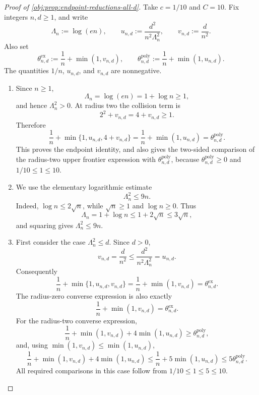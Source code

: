 \documentclass[11pt]{article}
\begin{document}
\begin{proof}[Proof of \cref{obj:prop:endpoint-reductions-all-d}]
Take \(c=1/10\) and \(C=10\).  Fix integers \(n,d\ge1\), and write
\[
\Lambda_n:=\log(en),\qquad
u_{n,d}:=\frac{d^2}{n^2\Lambda_n^2},\qquad
v_{n,d}:=\frac d{n^2}.
\]
Also set
\[
\theta^{\mathrm{ex}}_{n,d}:=\frac1n+\min(1,v_{n,d}),
\qquad
\theta^{\mathrm{poly}}_{n,d}:=\frac1n+\min(1,u_{n,d}).
\]
The quantities \(1/n\), \(u_{n,d}\), and \(v_{n,d}\) are nonnegative.

\begin{enumerate}
\item Since \(n\ge1\),
\[
\Lambda_n
=\log(en)=1+\log n\ge1,
\]
and hence \(\Lambda_n^2>0\).  At radius two the collision term is
\[
2^2+v_{n,d}=4+v_{n,d}\ge1.
\]
Therefore
\[
\frac1n+\min\{1,u_{n,d},4+v_{n,d}\}
=\frac1n+\min(1,u_{n,d})
=\theta^{\mathrm{poly}}_{n,d}.
\]
This proves the endpoint identity, and also gives the two-sided comparison of the
radius-two upper frontier expression with \(\theta^{\mathrm{poly}}_{n,d}\), because
\(\theta^{\mathrm{poly}}_{n,d}\ge0\) and \(1/10\le1\le10\).

\item We use the elementary logarithmic estimate
\[
\Lambda_n^2\le 9n.
\]
Indeed, \(\log n\le 2\sqrt n\), while \(\sqrt n\ge1\) and \(\log n\ge0\).  Thus
\[
\Lambda_n=1+\log n\le 1+2\sqrt n\le3\sqrt n,
\]
and squaring gives \(\Lambda_n^2\le9n\).

\item First consider the case \(\Lambda_n^2\le d\).  Since \(d>0\),
\[
v_{n,d}=\frac d{n^2}
\le
\frac{d^2}{n^2\Lambda_n^2}
=u_{n,d}.
\]
Consequently
\[
\frac1n+\min\{1,u_{n,d},v_{n,d}\}
=
\frac1n+\min(1,v_{n,d})
=
\theta^{\mathrm{ex}}_{n,d}.
\]
The radius-zero converse expression is also exactly
\[
\frac1n+\min(1,v_{n,d})=\theta^{\mathrm{ex}}_{n,d}.
\]
For the radius-two converse expression,
\[
\frac1n+\min(1,v_{n,d})+4\min(1,u_{n,d})
\ge
\theta^{\mathrm{poly}}_{n,d},
\]
and, using \(\min(1,v_{n,d})\le\min(1,u_{n,d})\),
\[
\frac1n+\min(1,v_{n,d})+4\min(1,u_{n,d})
\le
\frac1n+5\min(1,u_{n,d})
\le
5\theta^{\mathrm{poly}}_{n,d}.
\]
All required comparisons in this case follow from \(1/10\le1\le5\le10\).


\end{enumerate}
\end{proof}
\end{document}

